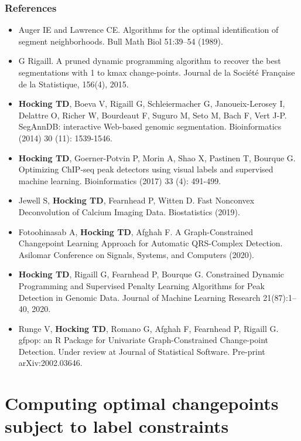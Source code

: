 \documentclass{beamer}
\begin{document}
\begin{frame}
  \frametitle{References}
  \scriptsize
  \begin{itemize}
  \item Auger IE and Lawrence CE. Algorithms for the optimal
    identification of segment neighborhoods. Bull Math Biol 51:39–54
    (1989).
  \item G Rigaill.  A pruned dynamic programming algorithm to recover
    the best segmentations with 1 to kmax change-points. Journal de la
    Société Française de la Statistique, 156(4), 2015. 
  \item \textbf{Hocking TD}, Boeva V, Rigaill G, Schleiermacher G,
    Janoueix-Lerosey I, Delattre O, Richer W, Bourdeaut F, Suguro M,
    Seto M, Bach F, Vert J-P. SegAnnDB: interactive Web-based genomic
    segmentation. Bioinformatics (2014) 30 (11): 1539-1546.
  \item \textbf{Hocking TD}, Goerner-Potvin P, Morin A, Shao X,
    Pastinen T, Bourque G. Optimizing ChIP-seq peak detectors using
    visual labels and supervised machine learning. Bioinformatics
    (2017) 33 (4): 491-499.
  \item Jewell S, \textbf{Hocking TD}, Fearnhead P, Witten D. Fast Nonconvex
    Deconvolution of Calcium Imaging Data. Biostatistics (2019).
  \item Fotoohinasab A, \textbf{Hocking TD}, Afghah F. A
    Graph-Constrained Changepoint Learning Approach for Automatic
    QRS-Complex Detection. Asilomar Conference on Signals, Systems,
    and Computers (2020).
  \item \textbf{Hocking TD}, Rigaill G, Fearnhead P, Bourque G. Constrained
    Dynamic Programming and Supervised Penalty Learning Algorithms for
    Peak Detection in Genomic Data. Journal of Machine Learning
    Research 21(87):1--40, 2020.
  \item Runge V, \textbf{Hocking TD}, Romano G, Afghah F, Fearnhead P, Rigaill
    G. gfpop: an R Package for Univariate Graph-Constrained
    Change-point Detection. Under review at Journal of Statistical
    Software. Pre-print arXiv:2002.03646.
  \end{itemize}
\end{frame}

\section{Computing optimal changepoints subject to label constraints}
\end{document}
